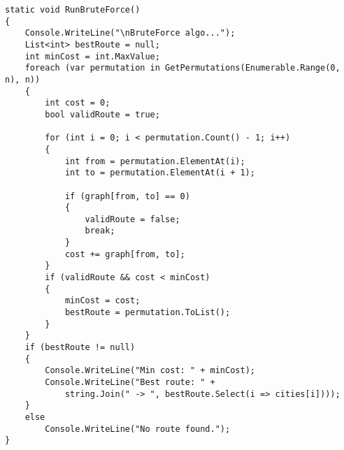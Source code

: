\begin{center}
\captionsetup{justification=raggedright,singlelinecheck=off}
\begin{lstlisting}[label=lst:lev_recursion,caption=Алгоритм полного перебора,numbers=none]
static void RunBruteForce()
{
    Console.WriteLine("\nBruteForce algo...");
    List<int> bestRoute = null;
    int minCost = int.MaxValue;
    foreach (var permutation in GetPermutations(Enumerable.Range(0, n), n))
    {
        int cost = 0;
        bool validRoute = true;

        for (int i = 0; i < permutation.Count() - 1; i++)
        {
            int from = permutation.ElementAt(i);
            int to = permutation.ElementAt(i + 1);

            if (graph[from, to] == 0)
            {
                validRoute = false;
                break;
            }
            cost += graph[from, to];
        }
        if (validRoute && cost < minCost)
        {
            minCost = cost;
            bestRoute = permutation.ToList();
        }
    }
    if (bestRoute != null)
    {
        Console.WriteLine("Min cost: " + minCost);
        Console.WriteLine("Best route: " +
            string.Join(" -> ", bestRoute.Select(i => cities[i])));
    }
    else
        Console.WriteLine("No route found.");
}
\end{lstlisting}
\end{center}
\clearpage

